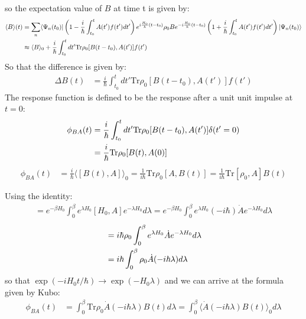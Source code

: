 \documentclass{article}
\begin{document}
so the expectation value of $B$ at time t is given by:
\begin{align}
    \langle B \rangle(t) &=
    \sum_n \langle \Psi_n(t_0) | \left( 1 - \frac{i}{\hbar} \int_{t_0}^{t} A(t')f(t') dt' \right) e^{i\frac{H_0}{h}(t-t_0)} \rho_{0} B
    e^{-i\frac{H_0}{h}(t-t_0)} \left( 1 + \frac{i}{\hbar} \int_{t_0}^{t} A(t')f(t') dt' \right) | \Psi_n(t_0) \rangle \notag \\
    &\approx \langle B \rangle_0  + \frac{i}{\hbar} \int_{t_0}^{t} dt' 
    \text{Tr} \rho_{0} [B(t-t_0),A(t')] f(t')
\end{align}
So that the difference is given by:
\begin{align}
    \Delta B(t) &= \frac{i}{\hbar} \int_{t_0}^{t} dt' \text{Tr} \rho_{0} [B(t-t_0),A(t')] f(t') 
\end{align}
The response function is defined to be the response after a unit unit impulse at $t = 0$:
\begin{align}
    \phi_{BA} (t) &= \frac{i}{\hbar} \int_{t_0}^{t} dt' \text{Tr} \rho_{0} [B(t-t_0),A(t')] \delta(t'=0) \notag \\
            &= \frac{i}{\hbar} \text{Tr} \rho_{0} [B(t),A(0)] 
\end{align} 
\begin{align}
    \phi_{BA} (t) &=\frac{i}{\hbar} \langle [B(t),A] \rangle_0 = \frac{1}{i\hbar} \text{Tr} \rho_0 [A, B(t)]
                = \frac{1}{i\hbar} \text{Tr} [\rho_0, A] B(t)
\end{align}

Using the identity:
\begin{gather}
    [A, e^{-\beta H_0}] = e^{-\beta H_0} \int_0^{\beta} e^{\lambda H_0} [H_0, A] e^{-\lambda H_0} d\lambda 
    = e^{-\beta H_0} \int_0^{\beta} e^{\lambda H_0} (-i\hbar) \dot{A} e^{-\lambda H_0} d\lambda 
\end{gather}
\begin{align}
    [\rho_{0}, A] &=  i\hbar \rho_{0} \int_0^{\beta} e^{\lambda H_0} \dot{A} e^{-\lambda H_0} d\lambda \notag \\
                &=  i\hbar  \int_0^{\beta} \rho_{0} \dot{A}(-i\hbar\lambda) d\lambda
\end{align}
so that $\exp(-iH_0t/\hbar) \to \exp( -H_0\lambda ) $
and we can arrive at the formula given by Kubo:
\begin{align}
    \phi_{BA} (t) &= \int_0^{\beta} \text{Tr} \rho_0 \dot{A}(-i\hbar\lambda) B(t) d\lambda 
    = \int_0^{\beta} \langle \dot{A}(-i\hbar\lambda) B(t) \rangle_0 d\lambda 
\end{align}
\end{document}
